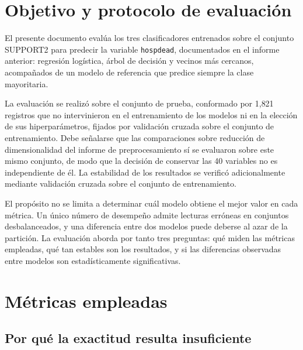 \documentclass[11pt]{article}
\begin{document}

\tableofcontents
\newpage

\section{Objetivo y protocolo de evaluación}

El presente documento evalúa los tres clasificadores entrenados sobre el conjunto SUPPORT2
\parencite{support2} para predecir la variable \texttt{hospdead}, documentados en el informe
anterior: regresión logística, árbol de decisión y vecinos más cercanos, acompañados de un modelo
de referencia que predice siempre la clase mayoritaria.

La evaluación se realizó sobre el conjunto de prueba, conformado por 1{,}821 registros que no
intervinieron en el entrenamiento de los modelos ni en la elección de sus hiperparámetros, fijados
por validación cruzada sobre el conjunto de entrenamiento. Debe señalarse que las comparaciones
sobre reducción de dimensionalidad del informe de preprocesamiento sí se evaluaron sobre este
mismo conjunto, de modo que la decisión de conservar las 40 variables no es independiente de él. La estabilidad
de los resultados se verificó adicionalmente mediante validación cruzada sobre el conjunto de
entrenamiento.

El propósito no se limita a determinar cuál modelo obtiene el mejor valor en cada métrica. Un
único número de desempeño admite lecturas erróneas en conjuntos desbalanceados, y una diferencia
entre dos modelos puede deberse al azar de la partición. La evaluación aborda por tanto tres
preguntas: qué miden las métricas empleadas, qué tan estables son los resultados, y si las
diferencias observadas entre modelos son estadísticamente significativas.

\section{Métricas empleadas}

\subsection{Por qué la exactitud resulta insuficiente}
\end{document}
